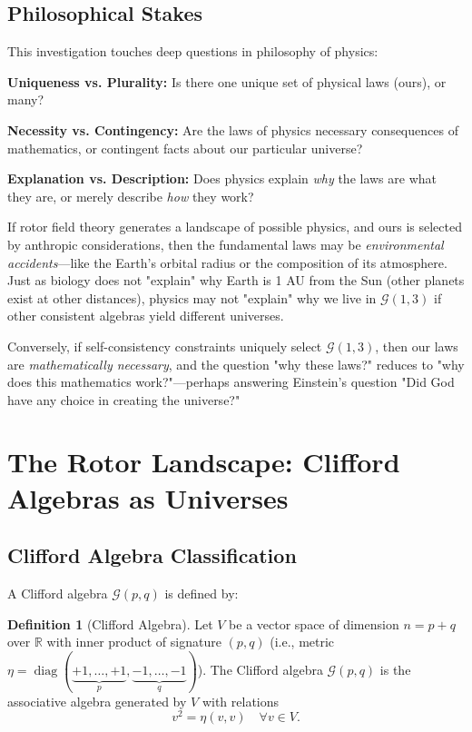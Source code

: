 \documentclass[11pt,a4paper]{article}
\numberwithin{equation}{section}
\theoremstyle{plain}
\theoremstyle{definition}
\newtheorem{definition}[theorem]{Definition}
\theoremstyle{remark}
\newcommand{\R}{\mathbb{R}}
\newcommand{\Cl}{\mathcal{G}}               %
\DeclareMathOperator{\diag}{diag}
\begin{document}
\subsection{Philosophical Stakes}

This investigation touches deep questions in philosophy of physics:

\textbf{Uniqueness vs. Plurality:} Is there one unique set of physical laws (ours), or many?

\textbf{Necessity vs. Contingency:} Are the laws of physics necessary consequences of mathematics, or contingent facts about our particular universe?

\textbf{Explanation vs. Description:} Does physics explain \emph{why} the laws are what they are, or merely describe \emph{how} they work?

If rotor field theory generates a landscape of possible physics, and ours is selected by anthropic considerations, then the fundamental laws may be \emph{environmental accidents}—like the Earth's orbital radius or the composition of its atmosphere. Just as biology does not "explain" why Earth is 1 AU from the Sun (other planets exist at other distances), physics may not "explain" why we live in $\Cl(1,3)$ if other consistent algebras yield different universes.

Conversely, if self-consistency constraints uniquely select $\Cl(1,3)$, then our laws are \emph{mathematically necessary}, and the question "why these laws?" reduces to "why does this mathematics work?"—perhaps answering Einstein's question "Did God have any choice in creating the universe?"

\section{The Rotor Landscape: Clifford Algebras as Universes}
\label{sec:landscape}

\subsection{Clifford Algebra Classification}

A Clifford algebra $\Cl(p,q)$ is defined by:

\begin{definition}[Clifford Algebra]
Let $V$ be a vector space of dimension $n = p+q$ over $\R$ with inner product of signature $(p,q)$ (i.e., metric $\eta = \diag(\underbrace{+1,\ldots,+1}_{p}, \underbrace{-1,\ldots,-1}_{q})$). The Clifford algebra $\Cl(p,q)$ is the associative algebra generated by $V$ with relations
\begin{equation}
v^2 = \eta(v,v) \quad \forall v \in V.
\label{eq:clifford-def}
\end{equation}
\end{definition}
\end{document}
